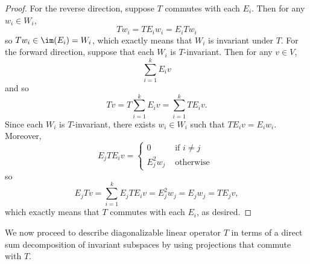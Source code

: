 \documentclass[linearalgebraII]{subfiles}
\begin{document}
    \begin{proof}
        For the reverse direction, suppose $T$ commutes with each $E_i$. Then for any $w_i\in W_i$,
        \begin{equation*}
            Tw_i = TE_iw_i = E_iTw_i
        \end{equation*}
        so $Tw_i\in \im(E_i) = W_i$, which exactly means that $W_i$ is invariant under $T$. For the forward direction, suppose that each $W_i$ is $T$-invariant. Then for any $v\in V$,
        \begin{equation*}
            \sum^{k}_{i=1} E_iv
        \end{equation*}
        and so
        \begin{equation*}
            Tv = T \sum^{k}_{i=1} E_iv = \sum^{k}_{i=1} TE_iv.
        \end{equation*}
        Since each $W_i$ is $T$-invariant, there exists $w_i\in W_i$ such that $TE_iv = E_iw_i$. Moreover,
        \begin{equation*}
            E_jTE_iv =
            \begin{cases}
                0 & \text{ if }i\neq j \\
                E_j^2w_j & \text{ otherwise }
            \end{cases}
        \end{equation*}
        so
        \begin{equation*}
            E_jTv = \sum^{k}_{i=1} E_jTE_iv = E_j^2w_j = E_jw_j = TE_jv,
        \end{equation*}
        which exactly means that $T$ commutes with each $E_i$, as desired.
    \end{proof}

    \begin{remark}
        We now proceed to describe diagonalizable linear operator $T$ in terms of a direct sum decomposition of invariant subspaces by using projections that commute with $T$.
    \end{remark}
\end{document}
